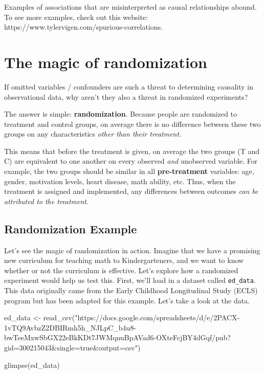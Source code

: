 \documentclass[
  letterpaper,
  DIV=11,
  numbers=noendperiod]{scrreprt}
\newenvironment{Shaded}{\begin{snugshade}}{\end{snugshade}}
\newcommand{\FunctionTok}[1]{\textcolor[rgb]{0.28,0.35,0.67}{#1}}
\newcommand{\NormalTok}[1]{\textcolor[rgb]{0.00,0.23,0.31}{#1}}
\newcommand{\OtherTok}[1]{\textcolor[rgb]{0.00,0.23,0.31}{#1}}
\newcommand{\StringTok}[1]{\textcolor[rgb]{0.13,0.47,0.30}{#1}}
\theoremstyle{definition}
\theoremstyle{remark}
\begin{document}
Examples of associations that are misinterpreted as causal relationships
abound. To see more examples, check out this website:
https://www.tylervigen.com/spurious-correlations.

\hypertarget{the-magic-of-randomization}{%
\section{The magic of randomization}\label{the-magic-of-randomization}}

If omitted variables / confounders are such a threat to determining
causality in observational data, why aren't they also a threat in
randomized experiments?

The answer is simple: \textbf{randomization}. Because people are
randomized to treatment and control groups, on average there is no
difference between these two groups on any characteristics \emph{other
than their treatment}.

This means that before the treatment is given, on average the two groups
(T and C) are equivalent to one another on every observed \emph{and}
unobserved variable. For example, the two groups should be similar in
all \textbf{pre-treatment} variables: age, gender, motivation levels,
heart disease, math ability, etc. Thus, when the treatment is assigned
and implemented, any differences between outcomes \emph{can be
attributed to the treatment}.

\hypertarget{sec-ed-data}{%
\subsection{Randomization Example}\label{sec-ed-data}}

Let's see the magic of randomization in action. Imagine that we have a
promising new curriculum for teaching math to Kindergarteners, and we
want to know whether or not the curriculum is effective. Let's explore
how a randomized experiment would help us test this. First, we'll load
in a dataset called \texttt{ed\_data}. This data originally came from
the Early Childhood Longitudinal Study (ECLS) program but has been
adapted for this example. Let's take a look at the data.

\begin{Shaded}
\begin{Highlighting}[]
\NormalTok{ed\_data }\OtherTok{\textless{}{-}} \FunctionTok{read\_csv}\NormalTok{(}\StringTok{"https://docs.google.com/spreadsheets/d/e/2PACX{-}1vTQ9AvbzZ2DBIRmh5h\_NJLpC\_b4u8{-}bwTeeMxwSbGX22eBkKDt7JWMqnuBpAVad6{-}OXteFcjBY4dGqf/pub?gid=300215043\&single=true\&output=csv"}\NormalTok{)}

\FunctionTok{glimpse}\NormalTok{(ed\_data)}
\end{Highlighting}
\end{Shaded}
\end{document}

